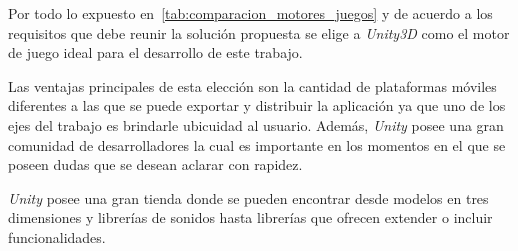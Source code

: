 Por todo lo expuesto en~\ref{tab:comparacion_motores_juegos} y de acuerdo a los
requisitos que debe reunir la solución propuesta se elige a \textit{Unity3D} como el
motor de juego ideal para el desarrollo de este trabajo.

Las ventajas principales de esta elección son la cantidad de plataformas móviles
diferentes a las que se puede exportar y distribuir la aplicación ya que uno de
los ejes del trabajo es brindarle ubicuidad al usuario. Además, \textit{Unity}
posee una gran comunidad de desarrolladores la cual es importante en los
momentos en el que se poseen dudas que se desean aclarar con rapidez.

\textit{Unity} posee una gran tienda donde se pueden encontrar desde modelos en
tres dimensiones y librerías de sonidos hasta librerías que ofrecen extender o incluir
funcionalidades. 
